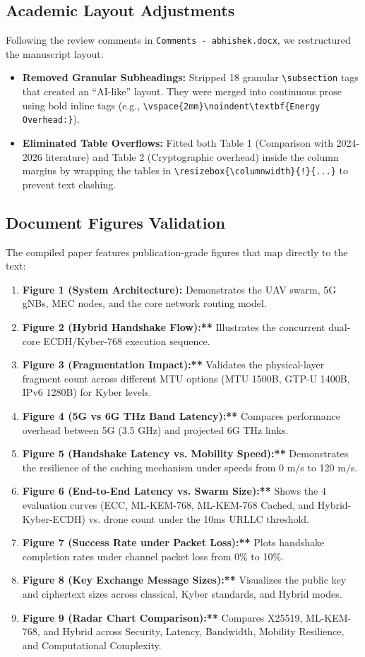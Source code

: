 \documentclass[11pt,a4paper]{article}
\begin{document}
\subsection{Academic Layout Adjustments}
Following the review comments in \texttt{Comments - abhishek.docx}, we restructured the manuscript layout:
\begin{itemize}
    \item \textbf{Removed Granular Subheadings:} Stripped 18 granular \texttt{\textbackslash subsection} tags that created an ``AI-like'' layout. They were merged into continuous prose using bold inline tags (e.g., \texttt{\textbackslash vspace\{2mm\}\textbackslash noindent\textbackslash textbf\{Energy Overhead:\}}).
    \item \textbf{Eliminated Table Overflows:} Fitted both Table 1 (Comparison with 2024-2026 literature) and Table 2 (Cryptographic overhead) inside the column margins by wrapping the tables in \texttt{\textbackslash resizebox\{\textbackslash columnwidth\}\{!\}\{...\}} to prevent text clashing.
\end{itemize}

\subsection{Document Figures Validation}
The compiled paper features publication-grade figures that map directly to the text:
\begin{enumerate}
    \item \textbf{Figure 1 (System Architecture):} Demonstrates the UAV swarm, 5G gNBs, MEC nodes, and the core network routing model.
    \item \textbf{Figure 2 (Hybrid Handshake Flow):**} Illustrates the concurrent dual-core ECDH/Kyber-768 execution sequence.
    \item \textbf{Figure 3 (Fragmentation Impact):**} Validates the physical-layer fragment count across different MTU options (MTU 1500B, GTP-U 1400B, IPv6 1280B) for Kyber levels.
    \item \textbf{Figure 4 (5G vs 6G THz Band Latency):**} Compares performance overhead between 5G (3.5 GHz) and projected 6G THz links.
    \item \textbf{Figure 5 (Handshake Latency vs. Mobility Speed):**} Demonstrates the resilience of the caching mechanism under speeds from 0 m/s to 120 m/s.
    \item \textbf{Figure 6 (End-to-End Latency vs. Swarm Size):**} Shows the 4 evaluation curves (ECC, ML-KEM-768, ML-KEM-768 Cached, and Hybrid-Kyber-ECDH) vs. drone count under the 10ms URLLC threshold.
    \item \textbf{Figure 7 (Success Rate under Packet Loss):**} Plots handshake completion rates under channel packet loss from 0\% to 10\%.
    \item \textbf{Figure 8 (Key Exchange Message Sizes):**} Visualizes the public key and ciphertext sizes across classical, Kyber standards, and Hybrid modes.
    \item \textbf{Figure 9 (Radar Chart Comparison):**} Compares X25519, ML-KEM-768, and Hybrid across Security, Latency, Bandwidth, Mobility Resilience, and Computational Complexity.
\end{enumerate}
\end{document}
